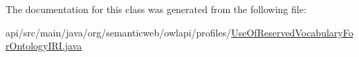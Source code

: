 The documentation for this class was generated from the following file\-:\begin{DoxyCompactItemize}
\item 
api/src/main/java/org/semanticweb/owlapi/profiles/\hyperlink{_use_of_reserved_vocabulary_for_ontology_i_r_i_8java}{Use\-Of\-Reserved\-Vocabulary\-For\-Ontology\-I\-R\-I.\-java}\end{DoxyCompactItemize}
